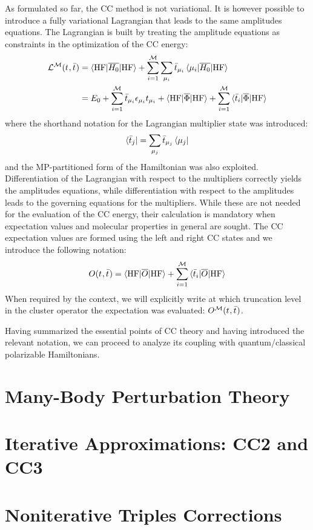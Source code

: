 As formulated so far, the \acs{CC} method is not variational. It is
however possible to introduce a fully variational Lagrangian that
leads to the same amplitudes equations. The Lagrangian is built by
treating the amplitude equations as constraints in the optimization of
the \acs{CC} energy:
\begin{equation}\label{eq:cc-lagrangian}
  \begin{aligned}
    \mathcal{L}^\mathcal{M}(t_{}, \bar{t}_{})
    &=
    \braket{\mathrm{HF} | \overline{H_0} | \mathrm{HF}}
    + \sum_{i=1}^{\mathcal{M}}\sum_{\mu_i}
    \bar{t}_{\mu_i}\braket{\mu_i | \overline{H_0} | \mathrm{HF}} \\
    &=
  E_0
  + \sum_{i=1}^{\mathcal{M}}\bar{t}_{\mu_i}\epsilon_{\mu_i}t_{\mu_i}
  + \braket{\mathrm{HF} | \overline{\Phi} | \mathrm{HF}}
  + \sum_{i=1}^{\mathcal{M}}\braket{\bar{t}_{i} | \overline{\Phi} | \mathrm{HF}}
  \end{aligned}
\end{equation}
where the shorthand notation for the Lagrangian multiplier state was
introduced:
\begin{equation}
  \bra{\bar{t}_{j}} = \sum_{\mu_j}\bar{t}_{\mu_j}\bra{\mu_j}
\end{equation}
and the \acs{MP}-partitioned form of the Hamiltonian was also exploited.
Differentiation of the Lagrangian with respect to the multipliers
correctly yields the amplitudes equations, while differentiation with
respect to the amplitudes leads to the governing equations for the
multipliers. While these are not needed for the evaluation of the
\acs{CC} energy, their calculation is mandatory when expectation values
and molecular properties in general are sought.
The \acs{CC} expectation values are formed using the left and
right \acs{CC} states and we introduce the following notation:
\begin{equation}
  O(t_{}, \bar{t}_{}) = \braket{\mathrm{HF} | \overline{O} | \mathrm{HF} }
  + \sum_{i=1}^{\mathcal{M}}\braket{\bar{t}_{i} | \overline{O} | \mathrm{HF} }
\end{equation}
When required by the context, we will explicitly write at which
truncation level in the cluster operator the expectation was evaluated:
$O^\mathcal{M}(t_{}, \bar{t}_{})$.

Having summarized the essential points of \acs{CC} theory and having
introduced the relevant notation, we can proceed to analyze its coupling
with quantum/classical polarizable Hamiltonians.


\section{Many-Body Perturbation Theory}\label{sec:MBPT}

\section{Iterative Approximations: CC2 and CC3}\label{sec:ccn}

\section{Noniterative Triples Corrections}\label{sec:ccsd-t}
